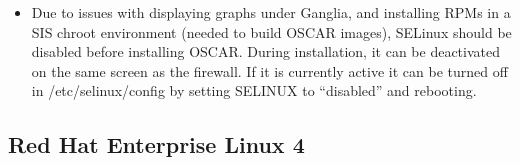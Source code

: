 \begin{itemize}

\item Due to issues with displaying graphs under Ganglia, and installing
  RPMs in a SIS chroot environment (needed to build OSCAR images), SELinux 
  should be disabled before installing OSCAR.  During installation, it can be
  deactivated on the same screen as the firewall.  If it is currently
  active it can be turned off in /etc/selinux/config by setting SELINUX 
  to ``disabled'' and rebooting.

\end{itemize}


\subsection{Red Hat Enterprise Linux 4}
\label{subsec:rhel4notes}

